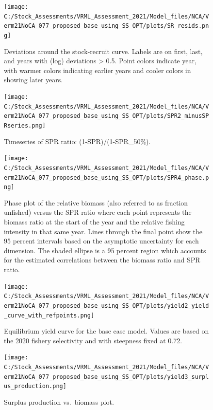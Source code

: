 \documentclass[11pt,
  english,
  a4paper,
]{article}
\begin{document}
\begin{figure}
\centering
\texttt{[image: C:/Stock\_Assessments/VRML\_Assessment\_2021/Model\_files/NCA/Verm21NoCA\_077\_proposed\_base\_using\_SS\_OPT/plots/SR\_resids.png]}
\caption{Deviations around the stock-recruit curve. Labels are on first, last, and years with (log) deviations \textgreater{} 0.5. Point colors indicate year, with warmer colors indicating earlier years and cooler colors in showing later years.\label{fig:bh-resids}}
\end{figure}

\begin{figure}
\centering
\texttt{[image: C:/Stock\_Assessments/VRML\_Assessment\_2021/Model\_files/NCA/Verm21NoCA\_077\_proposed\_base\_using\_SS\_OPT/plots/SPR2\_minusSPRseries.png]}
\caption{Timeseries of SPR ratio: (1-SPR)/(1-SPR\_50\%).\label{fig:1-spr}}
\end{figure}

\begin{figure}
\centering
\texttt{[image: C:/Stock\_Assessments/VRML\_Assessment\_2021/Model\_files/NCA/Verm21NoCA\_077\_proposed\_base\_using\_SS\_OPT/plots/SPR4\_phase.png]}
\caption{Phase plot of the relative biomass (also referred to as fraction unfished) versus the SPR ratio where each point represents the biomass ratio at the start of the year and the relative fishing intensity in that same year. Lines through the final point show the 95 percent intervals based on the asymptotic uncertainty for each dimension. The shaded ellipse is a 95 percent region which accounts for the estimated correlations between the biomass ratio and SPR ratio.\label{fig:phase}}
\end{figure}

\begin{figure}
\centering
\texttt{[image: C:/Stock\_Assessments/VRML\_Assessment\_2021/Model\_files/NCA/Verm21NoCA\_077\_proposed\_base\_using\_SS\_OPT/plots/yield2\_yield\_curve\_with\_refpoints.png]}
\caption{Equilibrium yield curve for the base case model. Values are based on the 2020 fishery selectivity and with steepness fixed at 0.72.\label{fig:yield2}}
\end{figure}

\begin{figure}
\centering
\texttt{[image: C:/Stock\_Assessments/VRML\_Assessment\_2021/Model\_files/NCA/Verm21NoCA\_077\_proposed\_base\_using\_SS\_OPT/plots/yield3\_surplus\_production.png]}
\caption{Surplus production vs.~biomass plot.\label{fig:yield3}}
\end{figure}
\end{document}

